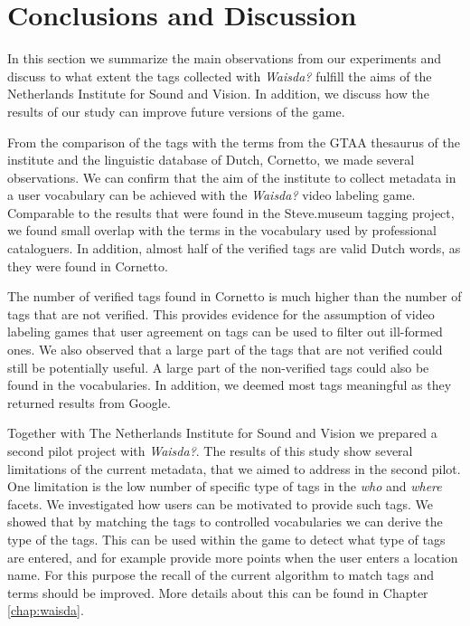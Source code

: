 \section{Conclusions and Discussion}
\label{sec:discussion}

In this section we summarize the main observations from our experiments and
discuss to what extent the tags collected with \emph{Waisda?} fulfill the aims
of the Netherlands Institute for Sound and Vision. In addition, we discuss how
the results of our study can improve future versions of the game.

From the comparison of the tags with the terms from the GTAA thesaurus of the
institute and the linguistic database of Dutch, Cornetto, we made several
observations. We can confirm that the aim of the institute to collect metadata
in a user vocabulary can be achieved with the \emph{Waisda?} video labeling game.
Comparable to the results that were found in the Steve.museum tagging project,
we found small overlap with the terms in the vocabulary used by professional
cataloguers. In addition, almost half of the verified tags are valid Dutch
words, as they were found in Cornetto. 

The number of verified tags found in Cornetto is much higher than the
number of tags that are not verified. This provides evidence
for the assumption of video labeling games that user agreement on tags can be
used to filter out ill-formed ones. We also observed that a large part of
the tags that are not verified could still be potentially useful. A large part
of the non-verified tags could also be found in the vocabularies. In addition,
we deemed most tags meaningful as they returned results from Google.

Together with The Netherlands Institute for Sound and Vision we prepared
a second pilot project with \emph{Waisda?}. The results of this study show
several limitations of the current metadata, that we aimed to address in the second
pilot. One limitation is the low number of specific type of tags in the
\emph{who} and \emph{where} facets. We investigated how users can be
motivated to provide such tags. We showed that by matching the tags to
controlled vocabularies we can derive the type of the tags. This can be used within the game
to detect what type of tags are entered,
and for example provide more points when the user enters a location name. For
this purpose the recall of the current algorithm to match tags and terms
should be improved. More details about this can be found in Chapter \ref{chap:waisda}.

